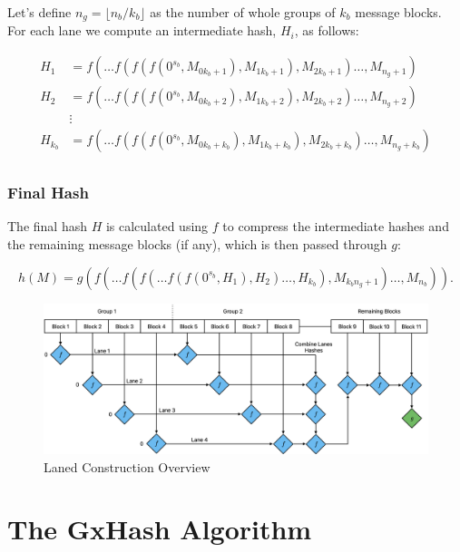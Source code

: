 \documentclass[10pt]{article}
\begin{document}
Let's define \( n_g = \lfloor {n_b}/{k_b} \rfloor \) as the number of whole groups of \( k_b \) message blocks. \\
For each lane we compute an intermediate hash, \( H_i \), as follows:

\begin{align*}
H_{1} &= f(\ldots f(f(f(0^{s_b}, M_{0k_b + 1}), M_{1k_b + 1}), M_{2k_b + 1})\ldots, M_{n_g + 1}) \\
H_{2} &= f(\ldots f(f(f(0^{s_b}, M_{0k_b + 2}), M_{1k_b + 2}), M_{2k_b + 2})\ldots, M_{n_g + 2}) \\
&\vdots \\
H_{k_b} &= f(\ldots f(f(f(0^{s_b}, M_{0k_b + k_b}), M_{1k_b + k_b}), M_{2k_b + k_b})\ldots, M_{n_g + k_b}) \\
\end{align*}

\subsubsection{Final Hash}

The final hash \( H \) is calculated using \( f \) to compress the intermediate hashes and the remaining message blocks (if any),
which is then passed through \( g \):

\begin{equation*}
h(M) = g\left( f( \ldots f(f(\ldots f(f(0^{s_b}, H_1), H_2) \ldots, H_{k_b}), M_{{k_b}{n_g}+1}) \ldots, M_{n_b} ) \right).
\end{equation*}

\begin{figure}[h]
\centering
\includegraphics[width=1\textwidth]{laned-construction.png}
\caption{Laned Construction Overview}
\label{fig:linear-construction}
\end{figure}

\section{The GxHash Algorithm}
\end{document}
